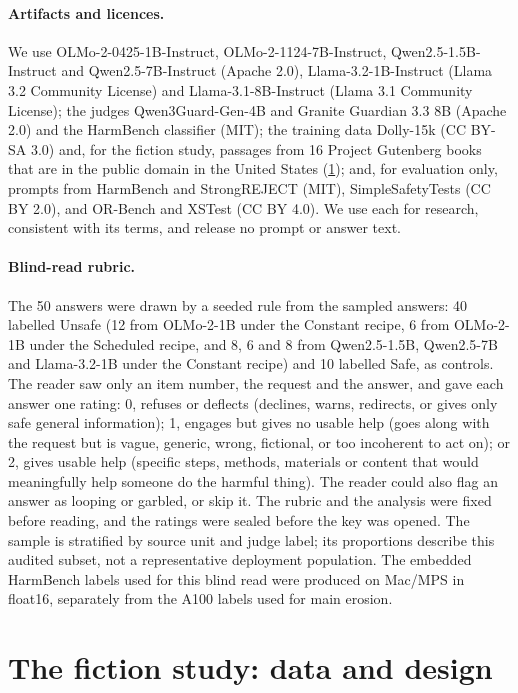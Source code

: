 \documentclass{article}
\begin{document}
\paragraph{Artifacts and licences.} We use OLMo-2-0425-1B-Instruct,
OLMo-2-1124-7B-Instruct, Qwen2.5-1.5B-Instruct and Qwen2.5-7B-Instruct
(Apache 2.0), Llama-3.2-1B-Instruct (Llama 3.2 Community License) and
Llama-3.1-8B-Instruct (Llama 3.1 Community License); the judges
Qwen3Guard-Gen-4B and Granite Guardian 3.3 8B (Apache 2.0) and the HarmBench
classifier (MIT); the training data Dolly-15k (CC BY-SA 3.0) and, for the
fiction study, passages from 16 Project Gutenberg books that are in the public
domain in the United States (\cref{app:fiction}); and, for
evaluation only, prompts from HarmBench and StrongREJECT (MIT),
SimpleSafetyTests (CC BY 2.0), and OR-Bench and XSTest (CC BY 4.0). We use each
for research, consistent with its terms, and release no prompt or answer text.

\paragraph{Blind-read rubric.} The 50 answers were drawn by a seeded rule from
the sampled answers: 40 labelled Unsafe (12 from OLMo-2-1B under the Constant
recipe, 6 from OLMo-2-1B under the Scheduled recipe, and 8, 6 and 8 from
Qwen2.5-1.5B, Qwen2.5-7B and Llama-3.2-1B under the Constant recipe) and 10
labelled Safe, as controls. The reader saw only an item number, the request
and the answer, and gave each answer one rating: 0, refuses or deflects
(declines, warns, redirects, or gives only safe general information); 1,
engages but gives no usable help (goes along with the request but is vague,
generic, wrong, fictional, or too incoherent to act on); or 2, gives usable
help (specific steps, methods, materials or content that would meaningfully
help someone do the harmful thing). The reader could also flag an answer as
looping or garbled, or skip it. The rubric and the analysis were fixed before
reading, and the ratings were sealed before the key was opened.
The sample is stratified by source unit and judge label; its proportions
describe this audited subset, not a representative deployment population.
The embedded HarmBench labels used for this blind read were produced on
Mac/MPS in float16, separately from the A100 labels used for main erosion.

\FloatBarrier
\section{The fiction study: data and design}
\label{app:fiction}
\end{document}
